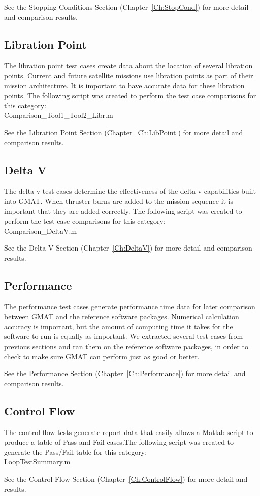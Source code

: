 See the Stopping Conditions Section
(Chapter~\ref{Ch:StopCond}) for more detail and comparison results.

\subsection{Libration Point}

The libration point test cases create data about the location of
several libration points. Current and future satellite missions use
libration points as part of their mission architecture. It is
important to have accurate data for these libration points. The
following script was created to perform the test case
comparisons for this category: \\
Comparison\_Tool1\_Tool2\_Libr.m

See the Libration Point Section
(Chapter~\ref{Ch:LibPoint}) for more detail and comparison results.

\subsection{Delta V}

The delta v test cases determine the effectiveness of the delta v
capabilities built into GMAT. When thruster burns are added to the
mission sequence it is important that they are added correctly. The
following script was created to perform the test case comparisons
for this category: \\
Comparison\_DeltaV.m

See the Delta V Section (Chapter~\ref{Ch:DeltaV}) for
more detail and comparison results.

\subsection{Performance}

The performance test cases generate performance time data for later
comparison between GMAT and the reference software packages.
Numerical calculation accuracy is important, but the amount of
computing time it takes for the software to run is equally as
important. We extracted several test cases from previous sections
and ran them on the reference software packages, in order to check
to make sure GMAT can perform just as good or better.

See the Performance Section
(Chapter~\ref{Ch:Performance}) for more detail and comparison
results.

\subsection{Control Flow}

The control flow tests generate report data that easily allows a
Matlab script to produce a table of Pass and Fail cases.The
following script was created to generate the Pass/Fail table
for this category: \\
LoopTestSummary.m

See the Control Flow Section
(Chapter~\ref{Ch:ControlFlow}) for more detail and results.
